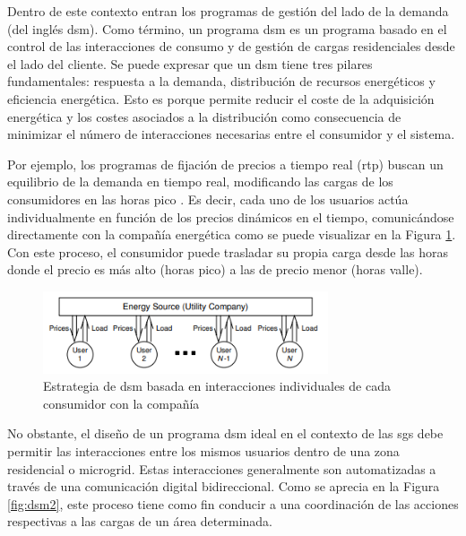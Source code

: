 \vspace{3mm}

Dentro de este contexto entran los programas de gestión del lado de la demanda (del inglés \gls{dsm}). Como término, un programa \gls{dsm} es un programa basado en el control de las interacciones de consumo y de gestión de cargas residenciales desde el lado del cliente. Se puede expresar que un \gls{dsm} tiene tres pilares fundamentales: respuesta a la demanda, distribución de recursos energéticos y eficiencia energética. Esto es porque permite reducir el coste de la adquisición energética y los costes asociados a la distribución como consecuencia de minimizar el número de interacciones necesarias entre el consumidor y el sistema. \cite{dsm}

\vspace{3mm}

Por ejemplo, los programas de fijación de precios a tiempo real (\gls{rtp}) buscan un equilibrio de la demanda en tiempo real, modificando las cargas de los consumidores en las horas pico \cite{rtp}. Es decir, cada uno de los usuarios actúa individualmente en función de los precios dinámicos en el tiempo, comunicándose directamente con la compañía energética como se puede visualizar en la Figura \ref{fig:dsm1}. Con este proceso, el consumidor puede trasladar su propia carga desde las horas donde el precio es más alto (horas pico) a las de precio menor (horas valle). \cite{dsm} \cite{pricing}

\vspace{3mm}

\begin{figure}[h]
  \centering
  \includegraphics[width=0.75\textwidth]{img/teoria/dsm1.png}
  \caption{Estrategia de \gls{dsm} basada en interacciones individuales de cada consumidor con la compañía \cite{pricing}}
  \label{fig:dsm1}
\end{figure}

\vspace{3mm}

No obstante, el diseño de un programa \gls{dsm} ideal en el contexto de las \gls{sg}s debe permitir las interacciones entre los mismos usuarios dentro de una zona residencial o microgrid. Estas interacciones generalmente son automatizadas a través de una comunicación digital bidireccional. Como se aprecia en la Figura \ref{fig:dsm2}, este proceso tiene como fin conducir a una coordinación de las acciones respectivas a las cargas de un área determinada. 

